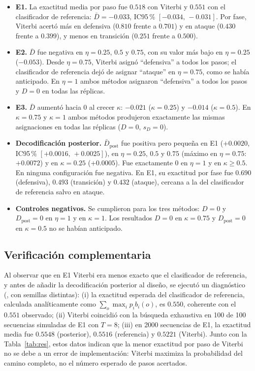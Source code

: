 \documentclass[11pt,a4paper]{article}
\begin{document}
\begin{itemize}
\item \textbf{E1.} La exactitud media por paso fue $0.518$ con Viterbi y
$0.551$ con el clasificador de referencia: $\bar D=-0.033$, IC95\,\%
$[-0.034,\,-0.031]$. Por fase, Viterbi acertó más en defensiva ($0.810$ frente a
$0.701$) y en ataque ($0.430$ frente a $0.399$), y menos en transición
($0.251$ frente a $0.500$).
\item \textbf{E2.} $\bar D$ fue negativa en $\eta=0.25$, $0.5$ y $0.75$, con su
valor más bajo en $\eta=0.25$ ($-0.053$). Desde $\eta=0.75$, Viterbi asignó
``defensiva'' a todos los pasos; el clasificador de referencia dejó de asignar
``ataque'' en $\eta=0.75$, como se había anticipado. En $\eta=1$ ambos métodos
asignaron ``defensiva'' a todos los pasos y $D=0$ en todas las réplicas.
\item \textbf{E3.} $\bar D$ aumentó hacia 0 al crecer $\kappa$: $-0.021$
($\kappa=0.25$) y $-0.014$ ($\kappa=0.5$). En $\kappa=0.75$ y $\kappa=1$ ambos
métodos produjeron exactamente las mismas asignaciones en todas las réplicas
($D=0$, $s_D=0$).
\item \textbf{Decodificación posterior.} $\bar D_{\mathrm{post}}$ fue positiva
pero pequeña en E1 ($+0.0020$, IC95\,\% $[+0.0016,\,+0.0025]$), en
$\eta=0.25$, $0.5$ y $0.75$ (máximo en $\eta=0.75$: $+0.0072$) y en
$\kappa=0.25$ ($+0.0005$). Fue exactamente 0 en $\eta=1$ y en
$\kappa\ge0.5$. En ninguna configuración fue negativa. En E1, su exactitud por
fase fue $0.690$ (defensiva), $0.493$ (transición) y $0.432$ (ataque), cercana a
la del clasificador de referencia salvo en ataque.
\item \textbf{Controles negativos.} Se cumplieron para los tres métodos: $D=0$
y $D_{\mathrm{post}}=0$ en $\eta=1$ y en $\kappa=1$. Los resultados $D=0$ en
$\kappa=0.75$ y $D_{\mathrm{post}}=0$ en $\kappa=0.5$ no se habían anticipado.
\end{itemize}

\subsection{Verificación complementaria}

Al observar que en E1 Viterbi era menos exacto que el clasificador de
referencia, y antes de añadir la decodificación posterior al diseño, se ejecutó
un diagnóstico (, con
semillas distintas): (i) la exactitud esperada del clasificador de referencia,
calculada analíticamente como $\sum_o\max_i p_i b_i(o)$, es $0.550$, coherente
con el $0.551$ observado; (ii) Viterbi coincidió con la búsqueda exhaustiva en
100 de 100 secuencias simuladas de E1 con $T=8$; (iii) en 2000 secuencias de
E1, la exactitud media fue $0.5548$ (posterior), $0.5516$ (referencia) y
$0.5221$ (Viterbi). Junto con la Tabla~\ref{tab:res}, estos datos indican que
la menor exactitud por paso de Viterbi no se debe a un error de implementación:
Viterbi maximiza la probabilidad del camino completo, no el número esperado de
pasos acertados.
\end{document}
